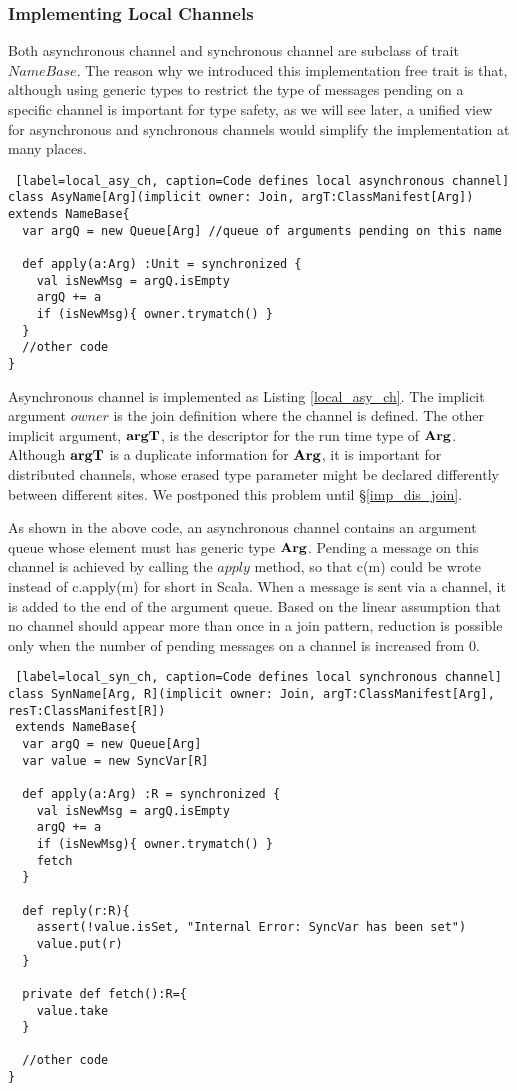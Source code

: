 \newpage
\subsubsection{Implementing Local Channels}
\label{imp_loc_join}
Both asynchronous channel and synchronous channel are subclass of trait $NameBase$.  The reason why we introduced this implementation free trait is that, although using generic types to restrict the type of messages pending on a specific channel is important for type safety, as we will see later, a unified view for asynchronous and synchronous channels would simplify the implementation at many places. 

\begin{lstlisting} [label=local_asy_ch, caption=Code defines local asynchronous channel]
class AsyName[Arg](implicit owner: Join, argT:ClassManifest[Arg]) extends NameBase{
  var argQ = new Queue[Arg] //queue of arguments pending on this name

  def apply(a:Arg) :Unit = synchronized { 
    val isNewMsg = argQ.isEmpty
    argQ += a
    if (isNewMsg){ owner.trymatch() }
  }
  //other code
}
\end{lstlisting}

Asynchronous channel is implemented as Listing \ref{local_asy_ch}.  The implicit argument $owner$ is the join definition where the channel is defined.  The other implicit argument, $\bf{argT}$, is the descriptor for the run time type of $\bf{Arg}$.  Although $\bf{argT}$ is a duplicate information for $\bf{Arg}$, it is important for distributed channels, whose erased type parameter might be declared differently between different sites.  We postponed this problem until  \S\ref{imp_dis_join}.

As shown in the above code, an asynchronous channel contains an argument queue whose element must has generic type $\bf{Arg}$.  Pending a message on this channel is achieved by calling the $apply$ method, so that c(m) could be wrote instead of c.apply(m) for short in Scala.  When a message is sent via a channel, it is added to the end of the argument queue.  Based on the linear assumption that no channel should appear more than once in a join pattern, reduction is possible only when the number of pending messages on a channel is increased from 0.


\begin{lstlisting} [label=local_syn_ch, caption=Code defines local synchronous channel]
class SynName[Arg, R](implicit owner: Join, argT:ClassManifest[Arg], resT:ClassManifest[R])
 extends NameBase{
  var argQ = new Queue[Arg]
  var value = new SyncVar[R] 
  
  def apply(a:Arg) :R = synchronized {
    val isNewMsg = argQ.isEmpty
    argQ += a
    if (isNewMsg){ owner.trymatch() }
    fetch
  }
  
  def reply(r:R){
    assert(!value.isSet, "Internal Error: SyncVar has been set")
    value.put(r)
  }

  private def fetch():R={
    value.take
  }

  //other code
}
\end{lstlisting}

